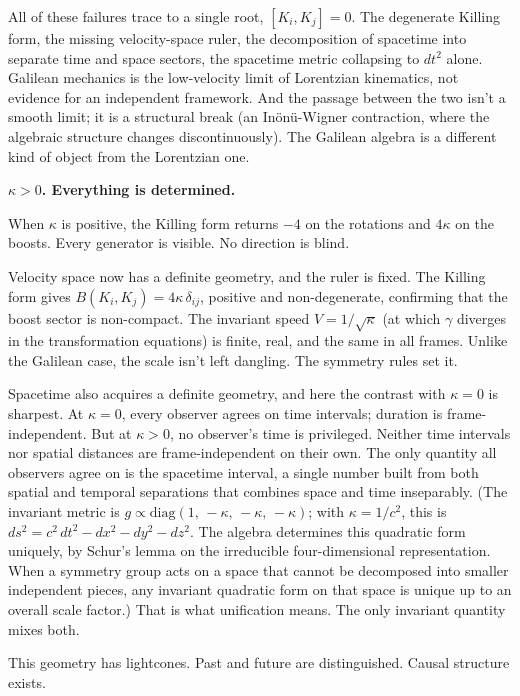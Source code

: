 \documentclass[11pt]{article}
\begin{document}
All of these failures trace to a single root, $[K_i, K_j] = 0$. The degenerate Killing form, the missing velocity-space ruler, the decomposition of spacetime into separate time and space sectors, the spacetime metric collapsing to $dt^2$ alone. Galilean mechanics is the low-velocity limit of Lorentzian kinematics, not evidence for an independent framework. And the passage between the two isn't a smooth limit; it is a structural break (an In\"on\"u-Wigner contraction, where the algebraic structure changes discontinuously). The Galilean algebra is a different kind of object from the Lorentzian one.

\bigskip
\textbf{$\kappa > 0$. Everything is determined.}

\smallskip
When $\kappa$ is positive, the Killing form returns $-4$ on the rotations and $4\kappa$ on the boosts. Every generator is visible. No direction is blind.

Velocity space now has a definite geometry, and the ruler is fixed. The Killing form gives $B(K_i, K_j) = 4\kappa\,\delta_{ij}$, positive and non-degenerate, confirming that the boost sector is non-compact. The invariant speed $V = 1/\sqrt{\kappa}$ (at which $\gamma$ diverges in the transformation equations) is finite, real, and the same in all frames. Unlike the Galilean case, the scale isn't left dangling. The symmetry rules set it.

Spacetime also acquires a definite geometry, and here the contrast with $\kappa = 0$ is sharpest. At $\kappa = 0$, every observer agrees on time intervals; duration is frame-independent. But at $\kappa > 0$, no observer's time is privileged. Neither time intervals nor spatial distances are frame-independent on their own. The only quantity all observers agree on is the spacetime interval, a single number built from both spatial and temporal separations that combines space and time inseparably. (The invariant metric is $g \propto \mathrm{diag}(1,\, -\kappa,\, -\kappa,\, -\kappa)$; with $\kappa = 1/c^2$, this is $ds^2 = c^2\,dt^2 - dx^2 - dy^2 - dz^2$. The algebra determines this quadratic form uniquely, by Schur's lemma on the irreducible four-dimensional representation. When a symmetry group acts on a space that cannot be decomposed into smaller independent pieces, any invariant quadratic form on that space is unique up to an overall scale factor.) That is what unification means. The only invariant quantity mixes both.

This geometry has lightcones. Past and future are distinguished. Causal structure exists.
\end{document}
